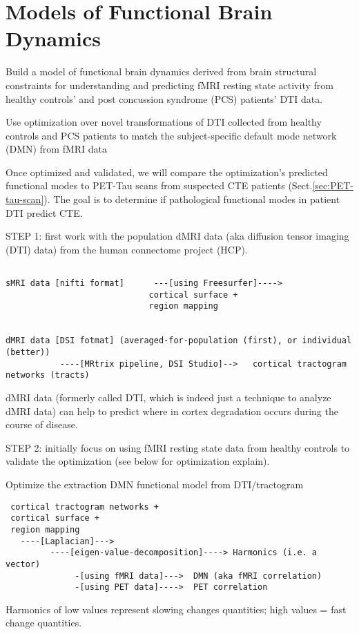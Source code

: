 \chapter{Models of Functional Brain Dynamics}

Build a model of functional brain dynamics derived from brain structural
constraints for understanding and predicting fMRI resting state activity from
healthy controls’ and post concussion syndrome (PCS) patients’ DTI data.


Use optimization over novel transformations of DTI collected from healthy
controls and PCS patients to match the subject-specific default mode network
(DMN) from fMRI data

Once optimized and validated, we will compare the optimization’s predicted
functional modes to PET-Tau scans from suspected CTE patients
(Sect.\ref{sec:PET-tau-scan}). The goal is to determine if pathological
functional modes in patient DTI predict CTE.


STEP 1: first work with the population dMRI data (aka diffusion tensor imaging (DTI) data) from
the human connectome project (HCP).
\begin{verbatim}

sMRI data [nifti format]      ---[using Freesurfer]----> 
                             cortical surface + 
                             region mapping


dMRI data [DSI fotmat] (averaged-for-population (first), or individual (better)) 
           ----[MRtrix pipeline, DSI Studio]-->   cortical tractogram networks (tracts)
\end{verbatim}

dMRI data (formerly called DTI, which is indeed just a technique to analyze dMRI
data) can help to predict where in cortex degradation occurs during the course
of disease.



STEP 2: initially focus on using fMRI resting state data from healthy controls
to validate the optimization (see below for optimization explain).


Optimize the extraction DMN functional model from DTI/tractogram
\begin{verbatim}
 cortical tractogram networks +
 cortical surface +
 region mapping
   ----[Laplacian]---> 
         ----[eigen-value-decomposition]----> Harmonics (i.e. a vector)
              -[using fMRI data]--->  DMN (aka fMRI correlation)
              -[using PET data]---->  PET correlation
\end{verbatim}
Harmonics of low values represent slowing changes quantities; high values = fast change quantities.

